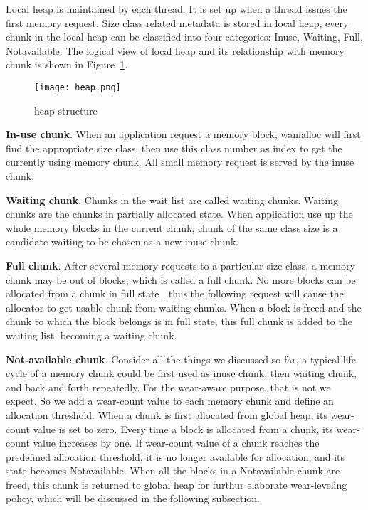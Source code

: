 \documentclass{vldb}
\begin{document}
Local heap is maintained by each thread. 
It is set up when a thread issues the first memory request.
Size class related metadata is stored in local heap, every chunk in the local heap can be classified into four categories: Inuse, Waiting, Full, Notavailable. 
The logical view of local heap and its relationship with memory chunk is shown in Figure~\ref{fig:heap}.

\begin{figure}[h]
\centering
\texttt{[image: heap.png]}
\caption{heap structure}
\label{fig:heap}
\end{figure}

\textbf{In-use chunk}. When an application request a memory block, wamalloc will first find the appropriate size class, then use this class number as index to get the currently using memory chunk. 
All small memory request is served by the inuse chunk.

\textbf{Waiting chunk}. Chunks in the wait list are called waiting chunks. Waiting chunks are the chunks in partially allocated state. 
When application use up the whole memory blocks in the current chunk, chunk of the same class size is a candidate waiting to be chosen as a new inuse chunk.

\textbf{Full chunk}. After several memory requests to a particular size class, a memory chunk may be out of blocks, which is called a full chunk.
No more blocks can be allocated from a chunk in full state , thus the following request will cause the allocator to get usable chunk from waiting chunks.
When a block is freed and the chunk to which the block belongs is in full state, this full chunk is added to the waiting list, becoming a waiting chunk.

\textbf{Not-available chunk}. Consider all the things we discussed so far, a typical life cycle of a memory chunk could be first used as inuse chunk, then waiting chunk, and back and forth repeatedly. 
For the wear-aware purpose, that is not we expect. 
So we add a wear-count value to each memory chunk and define an allocation threshold. 
When a chunk is first allocated from global heap, its wear-count value is set to zero.
Every time a block is allocated from a chunk, its wear-count value increases by one. 
If wear-count value of a chunk reaches the predefined allocation threshold, it is no longer available for allocation, and its state becomes Notavailable. 
When all the blocks in a Notavailable chunk are freed, this chunk is returned to global heap for furthur elaborate wear-leveling policy, which will be discussed in the following subsection.
\end{document}
